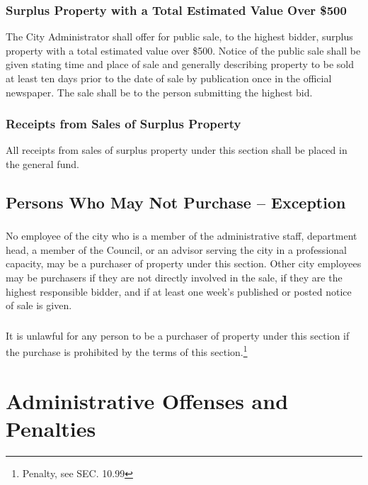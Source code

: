 \subsubsection{Surplus Property with a Total Estimated Value Over \$500}
The City Administrator shall offer for public sale, to the highest bidder, surplus property with a total estimated value over \$500.  Notice of the public sale shall be given stating time and place of sale and generally describing property to be sold at least ten days prior to the date of sale by publication once in the official newspaper.  The sale shall be to the person submitting the highest bid.
\subsubsection{Receipts from Sales of Surplus Property}
All receipts from sales of surplus property under this section shall be placed in the general fund.
\subsection{Persons Who May Not Purchase -- Exception}
\subsubsection{}
No employee of the city who is a member of the administrative staff, department head, a member of the Council, or an advisor serving the city in a professional capacity, may be a purchaser of property under this section.  Other city employees may be purchasers if they are not directly involved in the sale, if they are the highest responsible bidder, and if at least one week’s published or posted notice of sale is given.
\subsubsection{}
It is unlawful for any person to be a purchaser of property under this section if the purchase is prohibited by the terms of this section.\footnote{Penalty, see SEC. 10.99}

\section{Administrative Offenses and Penalties}
